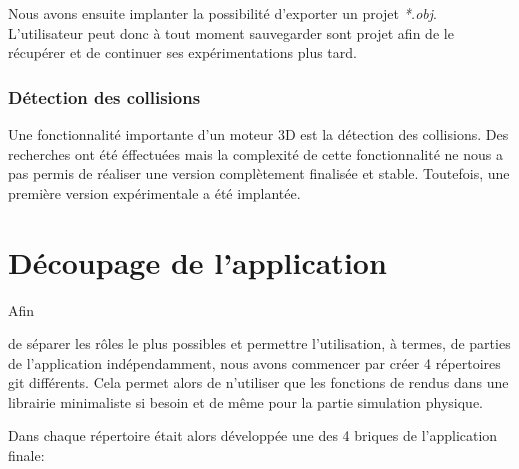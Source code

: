 \documentclass[11pt]{report}
\begin{document}
Nous avons ensuite implanter la possibilité d'exporter un projet \textit{*.obj}. L'utilisateur peut donc à tout moment sauvegarder sont projet afin de le récupérer et de continuer ses expérimentations plus tard.


\subsection{Détection des collisions}
Une fonctionnalité importante d'un moteur 3D est la détection des collisions. Des recherches ont été éffectuées mais la complexité de cette fonctionnalité ne nous a pas permis de réaliser une version complètement finalisée et stable. Toutefois, une première version expérimentale a été implantée.



\chapter{Découpage de l'application}

\hypertarget{découpage}{Afin} de séparer les rôles le plus possibles et permettre l'utilisation, à termes, de parties de l'application
indépendamment, nous avons commencer par créer 4 répertoires git différents. Cela permet alors de n'utiliser que
les fonctions de rendus dans une librairie minimaliste si besoin et de même pour la partie simulation physique.\newline

Dans chaque répertoire était alors développée une des 4 briques de l'application finale:\newline
\end{document}
